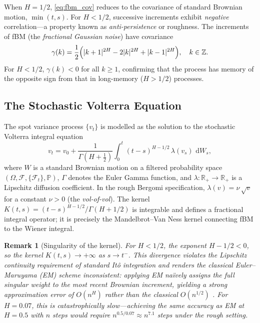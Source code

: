\documentclass[conference]{IEEEtran}
\newtheorem{remark}{Remark}
\newcommand{\R}{\mathbb{R}}
\newcommand{\Prob}{\mathbb{P}}
\newcommand{\F}{\mathcal{F}}
\newcommand{\G}{\Gamma}
\newcommand{\dd}{\mathrm{d}}
\newcommand{\dW}{\,\dd W}
\newcommand{\abs}[1]{\lvert #1 \rvert}
\begin{document}
When $H = 1/2$, \eqref{eq:fbm_cov} reduces to the covariance of
standard Brownian motion, $\min(t,s)$.  For $H < 1/2$, successive
increments exhibit \emph{negative} correlation—a property known as
\emph{anti-persistence} or roughness.  The increments of fBM (the
\emph{fractional Gaussian noise}) have covariance
\begin{equation}\label{eq:fgn_cov}
  \gamma(k) = \frac{1}{2}\Bigl(\abs{k+1}^{2H} - 2\abs{k}^{2H}
              + \abs{k-1}^{2H}\Bigr), \quad k \in \mathbb{Z}.
\end{equation}
For $H < 1/2$, $\gamma(k) < 0$ for all $k \geq 1$, confirming that
the process has memory of the opposite sign from that in long-memory
($H > 1/2$) processes.

\subsection{The Stochastic Volterra Equation}

The spot variance process $\{v_t\}$ is modelled as the solution to
the stochastic Volterra integral equation
\begin{equation}\label{eq:volterra}
  v_t = v_0 + \frac{1}{\Gamma\!\left(H + \tfrac{1}{2}\right)}
        \int_0^t (t-s)^{H - 1/2}\, \lambda(v_s)\, \dW_s,
\end{equation}
where $W$ is a standard Brownian motion on a filtered probability
space $(\Omega, \F, \{\F_t\}, \Prob)$, $\G$ denotes the Euler Gamma
function, and $\lambda : \R_+ \to \R_+$ is a Lipschitz diffusion
coefficient.  In the rough Bergomi specification,
$\lambda(v) = \nu\,\sqrt{v}$ for a constant $\nu > 0$ (the
\emph{vol-of-vol}).  The kernel $K(t,s) = (t-s)^{H-1/2}/\G(H+1/2)$
is integrable and defines a fractional integral operator; it is
precisely the Mandelbrot--Van Ness kernel connecting fBM to the
Wiener integral.

\begin{remark}[Singularity of the kernel]\label{rem:singular}
For $H < 1/2$, the exponent $H - 1/2 < 0$, so the kernel
$K(t,s) \to +\infty$ as $s \to t^-$.  This divergence violates the
Lipschitz continuity requirement of standard It\^{o} integration and
renders the classical Euler--Maruyama (EM) scheme inconsistent:
applying EM na\"ively assigns the full singular weight to the most
recent Brownian increment, yielding a strong approximation error of
$O(n^H)$ rather than the classical $O(n^{1/2})$
\cite{richard2021discretisation}.  For $H = 0.07$, this is
catastrophically slow—achieving the same accuracy as EM at $H = 0.5$
with $n$ steps would require $n^{0.5/0.07} \approx n^{7.1}$ steps
under the rough setting.
\end{remark}
\end{document}
